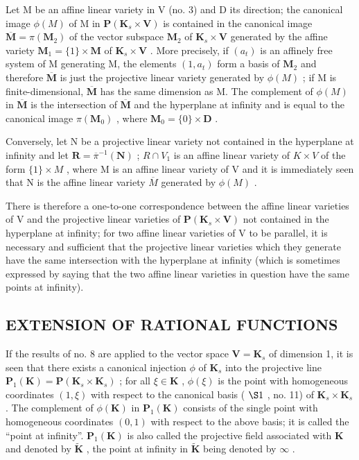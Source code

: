 Let M be an affine linear variety in V (no. 3) and D its direction; the canonical image \(\phi(M)\) of M in \(\mathbf{P}(\mathbf{K}_s \times \mathbf{V})\) is contained in the canonical image \(\overline{\mathbf{M}} = \pi(\mathbf{M}_2)\) of the vector subspace \(\mathbf{M}_2\) of \(\mathbf{K}_s \times \mathbf{V}\) generated by the affine variety \(\mathbf{M}_1 = \{1\} \times \mathbf{M}\) of \(\mathbf{K}_s \times \mathbf{V}\) . More precisely, if \((a_t)\) is an affinely free system of M generating M, the elements \((1, a_t)\) form a basis of \(\mathbf{M}_2\) and therefore \(\overline{\mathbf{M}}\) is just the projective linear variety generated by \(\phi(M)\) ; if M is finite-dimensional, \(\overline{\mathbf{M}}\) has the same dimension as M. The complement of \(\phi(M)\) in \(\overline{\mathbf{M}}\) is the intersection of \(\overline{\mathbf{M}}\) and the hyperplane at infinity and is equal to the canonical image \(\pi(\mathbf{M}_0)\) , where \(\mathbf{M}_0 = \{0\} \times \mathbf{D}\) .

Conversely, let N be a projective linear variety not contained in the hyperplane at infinity and let \(\mathbf{R} = \overline{\pi}^{-1}(\mathbf{N})\) ; \(R \cap V_{1}\) is an affine linear variety of \(K \times V\) of the form \(\{1\} \times M\) , where M is an affine linear variety of V and it is immediately seen that N is the affine linear variety \(\overline{M}\) generated by \(\phi(M)\) .

There is therefore a one-to-one correspondence between the affine linear varieties of V and the projective linear varieties of \(\mathbf{P}(\mathbf{K}_{s} \times \mathbf{V})\) not contained in the hyperplane at infinity; for two affine linear varieties of V to be parallel, it is necessary and sufficient that the projective linear varieties which they generate have the same intersection with the hyperplane at infinity (which is sometimes expressed by saying that the two affine linear varieties in question have the same points at infinity).

\subsection{EXTENSION OF RATIONAL FUNCTIONS}

If the results of no. 8 are applied to the vector space \(\mathbf{V} = \mathbf{K}_s\) of dimension 1, it is seen that there exists a canonical injection \(\phi\) of \(\mathbf{K}_s\) into the projective line \(\mathbf{P}_1(\mathbf{K}) = \mathbf{P}(\mathbf{K}_s \times \mathbf{K}_s)\) ; for all \(\xi \in \mathbf{K}\) , \(\phi(\xi)\) is the point with homogeneous coordinates \((1, \xi)\) with respect to the canonical basis ( \(\S 1\) , no. 11) of \(\mathbf{K}_s \times \mathbf{K}_s\) . The complement of \(\phi(\mathbf{K})\) in \(\mathbf{P}_1(\mathbf{K})\) consists of the single point with homogeneous coordinates \((0, 1)\) with respect to the above basis; it is called the ``point at infinity''. \(\mathbf{P}_1(\mathbf{K})\) is also called the projective field associated with \(\mathbf{K}\) and denoted by \(\tilde{\mathbf{K}}\) , the point at infinity in \(\tilde{\mathbf{K}}\) being denoted by \(\infty\) .

